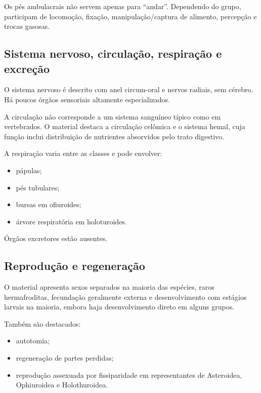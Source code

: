 \documentclass[a4paper,12pt]{article}
\begin{document}
\begin{conceito}
Os pés ambulacrais não servem apenas para ``andar''. Dependendo do grupo, participam de locomoção, fixação, manipulação/captura de alimento, percepção e trocas gasosas.
\end{conceito}

\subsection{Sistema nervoso, circulação, respiração e excreção}

O sistema nervoso é descrito com anel circum-oral e nervos radiais, sem cérebro. Há poucos órgãos sensoriais altamente especializados.

A circulação não corresponde a um sistema sanguíneo típico como em vertebrados. O material destaca a circulação celômica e o sistema hemal, cuja função inclui distribuição de nutrientes absorvidos pelo trato digestivo.

A respiração varia entre as classes e pode envolver:

\begin{itemize}
  \item pápulas;
  \item pés tubulares;
  \item bursas em ofiuroides;
  \item árvore respiratória em holoturoides.
\end{itemize}

Órgãos excretores estão ausentes.

\subsection{Reprodução e regeneração}

O material apresenta sexos separados na maioria das espécies, raros hermafroditas, fecundação geralmente externa e desenvolvimento com estágios larvais na maioria, embora haja desenvolvimento direto em alguns grupos.

Também são destacados:

\begin{itemize}
  \item autotomia;
  \item regeneração de partes perdidas;
  \item reprodução assexuada por fissiparidade em representantes de Asteroidea, Ophiuroidea e Holothuroidea.
\end{itemize}
\end{document}
